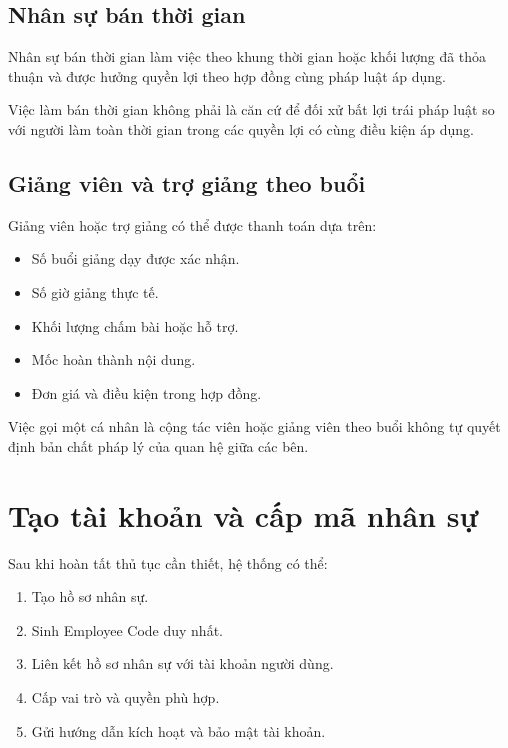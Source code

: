 \documentclass[12pt,a4paper]{article}
\begin{document}
\subsection{Nhân sự bán thời gian}

Nhân sự bán thời gian làm việc theo khung thời gian hoặc khối lượng
đã thỏa thuận và được hưởng quyền lợi theo hợp đồng cùng pháp luật áp dụng.

Việc làm bán thời gian không phải là căn cứ để đối xử bất lợi trái pháp luật
so với người làm toàn thời gian trong các quyền lợi có cùng điều kiện áp dụng.

\subsection{Giảng viên và trợ giảng theo buổi}

Giảng viên hoặc trợ giảng có thể được thanh toán dựa trên:

\begin{itemize}
    \item Số buổi giảng dạy được xác nhận.
    \item Số giờ giảng thực tế.
    \item Khối lượng chấm bài hoặc hỗ trợ.
    \item Mốc hoàn thành nội dung.
    \item Đơn giá và điều kiện trong hợp đồng.
\end{itemize}

Việc gọi một cá nhân là cộng tác viên hoặc giảng viên theo buổi
không tự quyết định bản chất pháp lý của quan hệ giữa các bên.

\section{Tạo tài khoản và cấp mã nhân sự}

Sau khi hoàn tất thủ tục cần thiết, hệ thống có thể:

\begin{enumerate}
    \item Tạo hồ sơ nhân sự.
    \item Sinh Employee Code duy nhất.
    \item Liên kết hồ sơ nhân sự với tài khoản người dùng.
    \item Cấp vai trò và quyền phù hợp.
    \item Gửi hướng dẫn kích hoạt và bảo mật tài khoản.
\end{enumerate}
\end{document}
